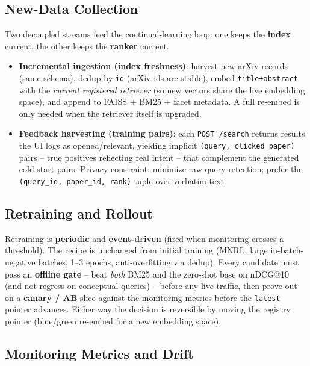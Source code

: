 \documentclass[12pt,a4paper]{article}
\begin{document}
\subsection{New-Data Collection}

Two decoupled streams feed the continual-learning loop: one keeps the \textbf{index} current, the other keeps the \textbf{ranker} current.
\begin{itemize}\setlength\itemsep{0.15em}
  \item \textbf{Incremental ingestion (index freshness)}: harvest new arXiv records (same schema), dedup by \texttt{id} (arXiv ids are stable), embed \texttt{title+abstract} with the \emph{current registered retriever} (so new vectors share the live embedding space), and append to FAISS + BM25 + facet metadata. A full re-embed is only needed when the retriever itself is upgraded.
  \item \textbf{Feedback harvesting (training pairs)}: each \texttt{POST /search} returns results the UI logs as opened/relevant, yielding implicit \texttt{(query, clicked\_paper)} pairs -- true positives reflecting real intent -- that complement the generated cold-start pairs. Privacy constraint: minimize raw-query retention; prefer the \texttt{(query\_id, paper\_id, rank)} tuple over verbatim text.
\end{itemize}

\subsection{Retraining and Rollout}

Retraining is \textbf{periodic} and \textbf{event-driven} (fired when monitoring crosses a threshold). The recipe is unchanged from initial training (MNRL, large in-batch-negative batches, 1--3 epochs, anti-overfitting via dedup). Every candidate must pass an \textbf{offline gate} -- beat \emph{both} BM25 and the zero-shot base on nDCG@10 (and not regress on conceptual queries) -- before any live traffic, then prove out on a \textbf{canary / AB} slice against the monitoring metrics before the \texttt{latest} pointer advances. Either way the decision is reversible by moving the registry pointer (blue/green re-embed for a new embedding space).

\subsection{Monitoring Metrics and Drift}
\end{document}
